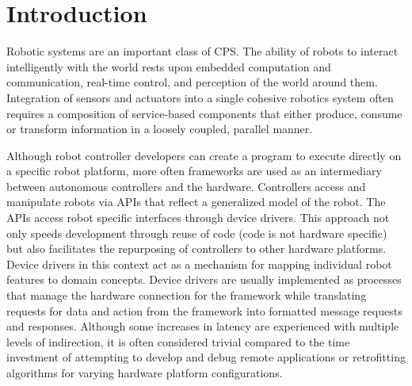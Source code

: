 \section{Introduction}
Robotic systems are an important class of CPS. The ability of robots to interact intelligently with the world rests upon embedded computation and communication, real-time control, and perception of the world around them\cite{Trinkle2008}. Integration of sensors and actuators into a single cohesive robotics system often requires a composition of service-based components that either produce, consume or transform information in a loosely coupled, parallel manner.


Although robot controller developers can create a program to execute directly on a specific robot platform, more often frameworks are used as an intermediary between autonomous controllers and the hardware.    Controllers access and manipulate robots via APIs that reflect a generalized model of the robot.  The APIs access robot specific interfaces through device drivers.  This approach not only speeds development through reuse of code (code is not hardware  specific) but also facilitates the repurposing of controllers to other hardware platforms.  Device drivers in this context act as a mechanism for mapping individual robot features to domain concepts.   Device drivers are usually implemented as processes that manage the hardware connection for the framework while translating requests for data and action from the framework into formatted message requests and responses.   Although some increases in latency are experienced with multiple levels of indirection, it is often considered trivial compared to the time investment of attempting to develop and debug remote applications or retrofitting algorithms for varying hardware platform configurations.

